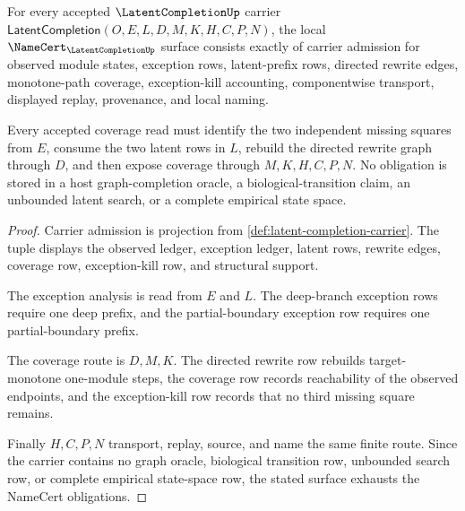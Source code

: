 \begin{theorem}
\label{thm:latent-completion-namecert-obligations}
For every accepted $\LatentCompletionUp$ carrier $\mathsf{LatentCompletion}(O,E,L,D,M,K,H,C,P,N)$, the local $\NameCert_{\LatentCompletionUp}$ surface consists exactly of carrier admission for observed module states, exception rows, latent-prefix rows, directed rewrite edges, monotone-path coverage, exception-kill accounting, componentwise transport, displayed replay, provenance, and local naming.

Every accepted coverage read must identify the two independent missing squares from $E$, consume the two latent rows in $L$, rebuild the directed rewrite graph through $D$, and then expose coverage through $M,K,H,C,P,N$. No obligation is stored in a host graph-completion oracle, a biological-transition claim, an unbounded latent search, or a complete empirical state space.
\end{theorem}
\begin{proof}
Carrier admission is projection from \autoref{def:latent-completion-carrier}. The tuple displays the observed ledger, exception ledger, latent rows, rewrite edges, coverage row, exception-kill row, and structural support.

The exception analysis is read from $E$ and $L$. The deep-branch exception rows require one deep prefix, and the partial-boundary exception row requires one partial-boundary prefix.

The coverage route is $D,M,K$. The directed rewrite row rebuilds target-monotone one-module steps, the coverage row records reachability of the observed endpoints, and the exception-kill row records that no third missing square remains.

Finally $H,C,P,N$ transport, replay, source, and name the same finite route. Since the carrier contains no graph oracle, biological transition row, unbounded search row, or complete empirical state-space row, the stated surface exhausts the NameCert obligations.
\end{proof}

